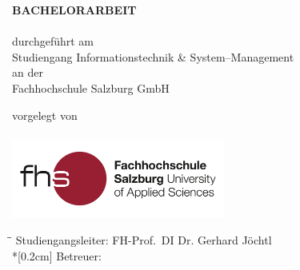 \begin{titlepage}

\hspace{7cm}

\begin{center}
	{\Large\uppercase\expandafter{\bf BACHELORARBEIT}}\\[0.5ex]
	\vspace{1cm}
	\Large{\bf\large \Title}\\
	\vspace{1.5cm}
	\normalsize durchgeführt am\\
	Studiengang Informationstechnik \& System--Management\\
	an der\\
	Fachhochschule Salzburg GmbH\\
\end{center}

\vspace{2cm}

\begin{center}
	\normalsize vorgelegt von
	\\
	{
		\Large{\bf\large \Author}\\
	}
	\vspace{2cm}
	\includegraphics[width=7cm]{BilderAllgemein/Logo.jpg}\medskip
\end{center}
	
\vspace{2cm}

\begin{tabbing}
	\hspace*{3cm}\=\hspace*{4cm}\= \kill
	\> Studiengangsleiter: \> FH-Prof.~DI Dr. Gerhard Jöchtl \\*[0.2cm]
	\> Betreuer: \> \Advisor
\end{tabbing}

\vfill	

\begin{center}
\VenueMonthYear\\
\end{center}
\end{titlepage}